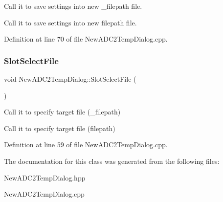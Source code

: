 Call it to save settings into new \+\_\+filepath file. 

Call it to save settings into new filepath file. 

Definition at line 70 of file New\+A\+D\+C2\+Temp\+Dialog.\+cpp.

\mbox{\label{class_new_a_d_c2_temp_dialog_aecb2c340ccb0c4ceb395ba688c092317}} 
\subsubsection{\texorpdfstring{Slot\+Select\+File}{SlotSelectFile}}
{\footnotesize\ttfamily void New\+A\+D\+C2\+Temp\+Dialog\+::\+Slot\+Select\+File (\begin{DoxyParamCaption}{ }\end{DoxyParamCaption})\hspace{0.3cm}{\ttfamily [slot]}}



Call it to specify target file (\+\_\+filepath) 

Call it to specify target file (filepath) 

Definition at line 59 of file New\+A\+D\+C2\+Temp\+Dialog.\+cpp.



The documentation for this class was generated from the following files\+:\begin{DoxyCompactItemize}
\item 
New\+A\+D\+C2\+Temp\+Dialog.\+hpp\item 
New\+A\+D\+C2\+Temp\+Dialog.\+cpp\end{DoxyCompactItemize}
